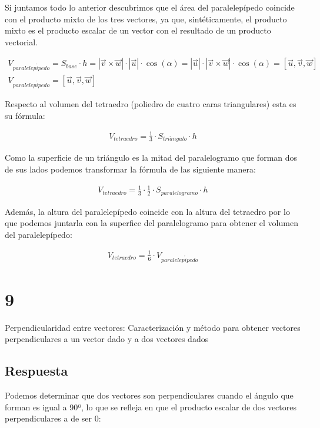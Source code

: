 \documentclass[
	12pt, %
	spanish, %
]{fphw}
\newcommand{\vu}{\vec{u}}
\newcommand{\vv}{\vec{v}}
\newcommand{\vw}{\vec{w}}
\begin{document}
Si juntamos todo lo anterior descubrimos que el área del paralelepípedo coincide con el producto mixto de los tres vectores, ya que, sintéticamente, el producto mixto es el producto escalar de un vector con el resultado de un producto vectorial.

\begin{gather*}
	V_{paralelep\acute{i}pedo} = S_{base} \cdot h = |\vv \times \vw| \cdot |\vu| \cdot \cos(\alpha) = |\vu| \cdot|\vv \times \vw| \cdot \cos(\alpha)=[\vu,\vv,\vw]\\
	V_{paralelep\acute{i}pedo} = [\vu,\vv,\vw]
\end{gather*}


Respecto al volumen del tetraedro (poliedro de cuatro caras triangulares) esta es su fórmula:

\begin{gather*}
	V_{tetraedro} = \frac{1}{3} \cdot S_{tri\acute{a}ngulo} \cdot h
\end{gather*}

Como la superficie de un triángulo es la mitad del paralelogramo que forman dos de sus lados podemos transformar la fórmula de las siguiente manera: 

\begin{gather*}
	V_{tetraedro} = \frac{1}{3} \cdot \frac{1}{2} \cdot S_{paralelogramo} \cdot h
\end{gather*}

Además, la altura del paralelepípedo coincide con la altura del tetraedro por lo que podemos juntarla con la superfice del paralelogramo para obtener el  volumen del paralelepípedo:

\begin{gather*}
	V_{tetraedro} = \frac{1}{6} \cdot V_{paralelep\acute{i}pedo} 
\end{gather*}


\section*{9}

\begin{problem}
	Perpendicularidad entre vectores: Caracterización y método para obtener
vectores perpendiculares a un vector dado y a dos vectores dados
\end{problem}

\subsection*{Respuesta} Podemos determinar que dos vectores son perpendiculares cuando el ángulo que forman es igual a 90º, lo que se refleja en que el producto escalar de dos vectores perpendiculares a de ser 0:
\end{document}
